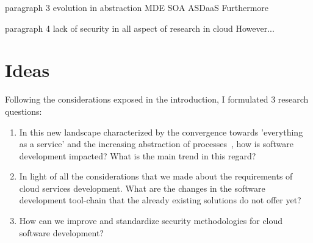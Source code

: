 \documentclass[a4paper, 10pt, conference]{ieeeconf}
\begin{document}
paragraph 3 evolution in abstraction MDE SOA ASDaaS
Furthermore 

paragraph 4 lack of security in all aspect of research in cloud
However...

\section{Ideas}

Following the considerations exposed in the introduction, I formulated 3 research questions:
\begin{enumerate}
 	\item In this new landscape characterized by the convergence towards 'everything as a service' and the increasing abstraction of processes~\cite{automatic-dev}, how is software development impacted? What is the main trend in this regard?
 	\item In light of all the considerations that we made about the requirements of cloud services development. What are the changes in the software development tool-chain that the already existing solutions do not offer yet? 
	\item How can we improve and standardize security methodologies for cloud software development?
\end{enumerate}





\end{document}
